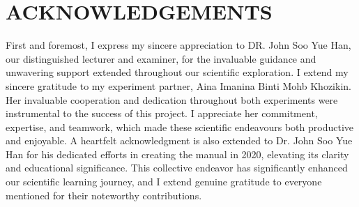 \documentclass[a4paper,11pt]{article}
\begin{document}
\section*{\large \center ACKNOWLEDGEMENTS}
\label{sec:ACKNOWLEDGEMENTS}
\quad First and foremost, I express my sincere appreciation to DR. John Soo Yue Han, our distinguished lecturer and examiner, for the invaluable guidance and unwavering support extended throughout our scientific exploration. I extend my sincere gratitude to my experiment partner, Aina Imanina Binti Mohb Khozikin. Her invaluable cooperation and dedication throughout both experiments were instrumental to the success of this project. I appreciate her commitment, expertise, and teamwork, which made these scientific endeavours both productive and enjoyable. A heartfelt acknowledgment is also extended to Dr. John Soo Yue Han for his dedicated efforts in creating the manual in 2020, elevating its clarity and educational significance. This collective endeavor has significantly enhanced our scientific learning journey, and I extend genuine gratitude to everyone mentioned for their noteworthy contributions.

\newpage
\renewcommand{\contentsname}{\centering CONTENTS}
\renewcommand{\cftsecleader}{\cftdotfill{\cftdotsep}} %
\renewcommand{\cftdotsep}{1.0} %
\tableofcontents
{}
{}
\label{sec:CONTENTS}

\newpage
{}
{}
\label{sec:LIST OF TABLES}
\listoftables

\newpage
{}
{}
\label{sec:LIST OF FIGURES}
\listoffigures

\newpage
{}
\end{document}
